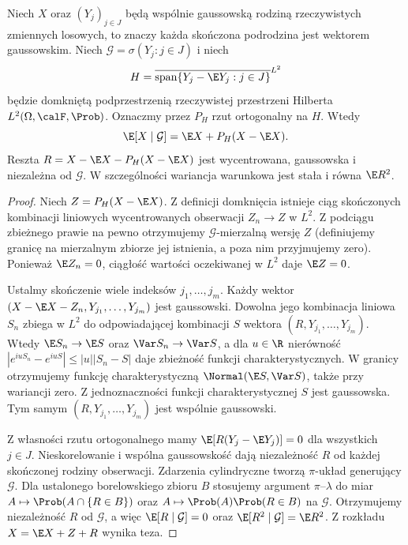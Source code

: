 \begin{twierdzenie}
\label{thm:gauss-prediction}
Niech $X$ oraz $(Y_j)_{j\in J}$ będą wspólnie gaussowską
rodziną rzeczywistych zmiennych losowych, to znaczy
każda skończona podrodzina jest wektorem gaussowskim.
Niech $\mathcal G=\sigma(Y_j:j\in J)$ i niech
\[
H=\overline{\operatorname{span}\{Y_j-\E Y_j:j\in J\}}^{L^2}
\]
będzie domkniętą podprzestrzenią rzeczywistej przestrzeni
Hilberta $L^2(\Omega,\calF,\Prob)$. Oznaczmy przez $P_H$
rzut ortogonalny na $H$. Wtedy
\[
\E[X\mid\mathcal G]=\E X+P_H(X-\E X).
\]
Reszta $R=X-\E X-P_H(X-\E X)$ jest wycentrowana,
gaussowska i niezależna od $\mathcal G$. W szczególności
wariancja warunkowa jest stała i równa $\E R^2$.
\end{twierdzenie}
\begin{proof}
Niech $Z=P_H(X-\E X)$. Z definicji domknięcia
istnieje ciąg skończonych kombinacji liniowych
wycentrowanych obserwacji $Z_n\to Z$ w $L^2$.
Z podciągu zbieżnego prawie na pewno otrzymujemy
$\mathcal G$-mierzalną wersję $Z$ (definiujemy
granicę na mierzalnym zbiorze jej istnienia, a poza nim
przyjmujemy zero). Ponieważ $\E Z_n=0$, ciągłość
wartości oczekiwanej w $L^2$ daje $\E Z=0$.

Ustalmy skończenie wiele indeksów $j_1,\ldots,j_m$.
Każdy wektor $(X-\E X-Z_n,Y_{j_1},\ldots,Y_{j_m})$
jest gaussowski. Dowolna jego kombinacja liniowa
$S_n$ zbiega w $L^2$ do odpowiadającej kombinacji $S$
wektora $(R,Y_{j_1},\ldots,Y_{j_m})$.
Wtedy $\E S_n\to\E S$ oraz $\Var S_n\to\Var S$,
a dla $u\in\R$ nierówność
$|e^{iuS_n}-e^{iuS}|\le |u||S_n-S|$
daje zbieżność funkcji charakterystycznych.
W granicy otrzymujemy funkcję charakterystyczną
$\Normal(\E S,\Var S)$, także przy wariancji zero.
Z jednoznaczności funkcji charakterystycznej $S$
jest gaussowska. Tym samym $(R,Y_{j_1},\ldots,Y_{j_m})$
jest wspólnie gaussowski.

Z własności rzutu ortogonalnego mamy
$\E[R(Y_j-\E Y_j)]=0$ dla wszystkich $j\in J$.
Nieskorelowanie i wspólna gaussowskość dają niezależność
$R$ od każdej skończonej rodziny obserwacji. Zdarzenia
cylindryczne tworzą $\pi$-układ generujący $\mathcal G$.
Dla ustalonego borelowskiego zbioru $B$ stosujemy
argument $\pi$--$\lambda$ do miar
$A\mapsto\Prob(A\cap\{R\in B\})$ oraz
$A\mapsto\Prob(A)\Prob(R\in B)$ na $\mathcal G$.
Otrzymujemy niezależność $R$ od $\mathcal G$,
a więc $\E[R\mid\mathcal G]=0$ oraz
$\E[R^2\mid\mathcal G]=\E R^2$.
Z rozkładu $X=\E X+Z+R$ wynika teza.
\end{proof}

